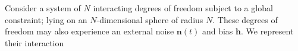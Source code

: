 Consider a system of $N$ interacting degrees of freedom subject to a global constraint; lying on an $N$-dimensional sphere of radius $N$. These degrees of freedom may also experience an external noise $\mathbf{n}(t)$ and bias $\mathbf{h}$. We represent their interaction 